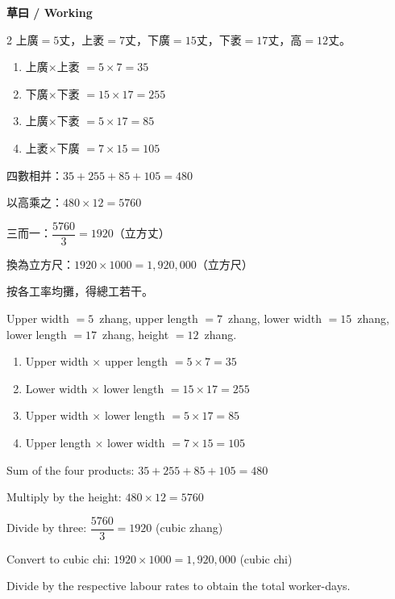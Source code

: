 \documentclass[11pt,a4paper]{article}
\begin{document}
\vspace{0.4em}

\noindent\textbf{\textcolor{chinesecolor}{草曰} / \textcolor{englishcolor}{Working}}

\vspace{0.2em}

\begin{paracol}{2}
上廣$=5$丈，上袤$=7$丈，下廣$=15$丈，下袤$=17$丈，高$=12$丈。

\begin{enumerate}
  \item 上廣$\times$上袤 $= 5 \times 7 = 35$
  \item 下廣$\times$下袤 $= 15 \times 17 = 255$
  \item 上廣$\times$下袤 $= 5 \times 17 = 85$
  \item 上袤$\times$下廣 $= 7 \times 15 = 105$
\end{enumerate}

四數相并：$35 + 255 + 85 + 105 = 480$

以高乘之：$480 \times 12 = 5760$

三而一：$\dfrac{5760}{3} = 1920$（立方丈）

換為立方尺：$1920 \times 1000 = 1{,}920{,}000$（立方尺）

按各工率均攤，得總工若干。

\switchcolumn

Upper width $= 5$~zhang, upper length $= 7$~zhang, lower width $= 15$~zhang,
lower length $= 17$~zhang, height $= 12$~zhang.

\begin{enumerate}
  \item Upper width $\times$ upper length $= 5 \times 7 = 35$
  \item Lower width $\times$ lower length $= 15 \times 17 = 255$
  \item Upper width $\times$ lower length $= 5 \times 17 = 85$
  \item Upper length $\times$ lower width $= 7 \times 15 = 105$
\end{enumerate}

Sum of the four products: $35 + 255 + 85 + 105 = 480$

Multiply by the height: $480 \times 12 = 5760$

Divide by three: $\dfrac{5760}{3} = 1920$ (cubic zhang)

Convert to cubic chi: $1920 \times 1000 = 1{,}920{,}000$ (cubic chi)

Divide by the respective labour rates to obtain the total worker-days.

\end{paracol}
\end{document}
